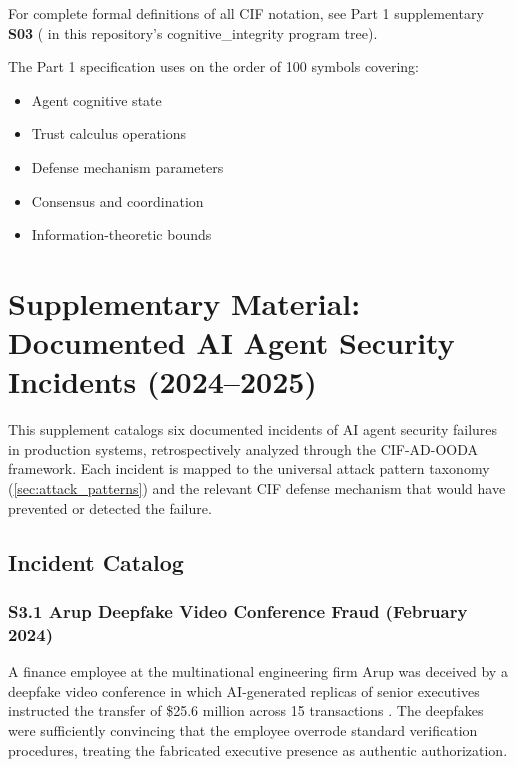 \documentclass[
]{article}
\providecommand{\tightlist}{%
  \setlength{\itemsep}{0pt}\setlength{\parskip}{0pt}}
\begin{document}
For complete formal definitions of all CIF notation, see Part 1
supplementary \textbf{S03}
( in
this repository's cognitive\_integrity program tree).

The Part 1 specification uses on the order of 100 symbols covering:

\begin{itemize}
\tightlist
\item
  Agent cognitive state
\item
  Trust calculus operations
\item
  Defense mechanism parameters
\item
  Consensus and coordination
\item
  Information-theoretic bounds
\end{itemize}

\newpage

\section{Supplementary Material: Documented AI Agent Security Incidents
(2024--2025)}\label{sec:empirical_grounding}

This supplement catalogs six documented incidents of AI agent security
failures in production systems, retrospectively analyzed through the
CIF-AD-OODA framework. Each incident is mapped to the universal attack
pattern taxonomy (\cref{sec:attack_patterns}) and the relevant CIF
defense mechanism that would have prevented or detected the failure.

\subsection{Incident Catalog}\label{incident-catalog}

\subsubsection{S3.1 Arup Deepfake Video Conference Fraud (February
2024)}\label{s3.1-arup-deepfake-video-conference-fraud-february-2024}

A finance employee at the multinational engineering firm Arup was
deceived by a deepfake video conference in which AI-generated replicas
of senior executives instructed the transfer of \$25.6 million across 15
transactions \cite{cnn2024arup}. The deepfakes were sufficiently
convincing that the employee overrode standard verification procedures,
treating the fabricated executive presence as authentic authorization.
\end{document}
